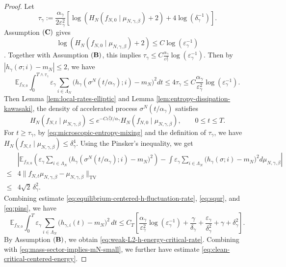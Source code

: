 \documentclass{article}
\begin{document}
\begin{proof}
Let
\[
\tau_\gamma
:=
\frac{\alpha_\gamma}{2\varepsilon_{\gamma}^2}
\left[
\log\!\left(H_N(f_{N,0}\mid\mu_{N,\gamma,\beta})+2\right) + 4\log(\delta_\gamma^{-1})
\right].
\]
Assumption \(({\bf C})\) gives
\[\log(H_N(f_{N,0}\mid\mu_{N,\gamma,\beta})+2)
\le C\log(\varepsilon_\gamma^{-1})\]. Together with Assumption \(({\bf B})\), this implies
\(
\tau_\gamma \le C\frac{\alpha_\gamma}{\varepsilon_\gamma^{2}}\log(\varepsilon_\gamma^{-1}).
\)
Then by \(|h_\gamma(\sigma;i)-m_N|\le2\), we have
\begin{equation}\label{eq:squr}
    \mathbb E_{f_{N,0}}\int_0^{T\wedge\tau_\gamma} \varepsilon_\gamma \sum_{i\in\Lambda_N} \bigl(h_\gamma(\sigma^N(t/\alpha_\gamma);i)-m_N\bigr)^2 dt \le 4\tau_\gamma \le C \frac{\alpha_\gamma}{\varepsilon_\gamma^{2}}\log(\varepsilon_\gamma^{-1}).
\end{equation}
Then Lemma \ref{lem:local-rates-elliptic} and Lemma \ref{lem:entropy-dissipation-kawasaki}, the density of accelerated process $\sigma^N(t/\alpha_\gamma)$ satisfies 
\begin{equation}\label{eq:microscopic-entropy-mixing}
    H_N(f_{N,t}\mid\mu_{N,\gamma,\beta})
\le e^{- C\varepsilon_{\gamma}^2t/\alpha_\gamma} H_N(f_{N,0}\mid\mu_{N,\gamma,\beta}),
\qquad 0\le t\le T.
\end{equation}
For \(t\ge\tau_\gamma\), by \eqref{eq:microscopic-entropy-mixing} and the
definition of \(\tau_\gamma\), we have
\(
H_N(f_{N,t}\mid\mu_{N,\gamma,\beta}) \le \delta_\gamma^4.
\)
Using the Pinsker's inequality, we get
\begin{align}\label{eq:pins}
    & \left| \mathbb E_{f_{N,0}} \left(\varepsilon_\gamma \sum_{i\in\Lambda_N}
\bigl(h_\gamma(\sigma^N(t/\alpha_\gamma);i)-m_N\bigr)^2 \right) - \int \varepsilon_\gamma \sum_{i\in\Lambda_N}
\bigl(h_\gamma(\sigma;i)-m_N\bigr)^2  d\mu_{N,\gamma,\beta}\right| \nonumber \\
\le & 4\|f_{N,t}\mu_{N,\gamma,\beta}-\mu_{N,\gamma,\beta}\|_{\mathrm{TV}} \nonumber \\
\le & 4\sqrt2\, \delta_\gamma^2 .
\end{align}
Combining estimate \eqref{eq:equilibrium-centered-h-fluctuation-rate}, \eqref{eq:squr}, and \eqref{eq:pins}, we have
\[
\mathbb E_{f_{N,0}}\int_0^T\varepsilon_\gamma\sum_{i\in\Lambda_N} \bigl(h_{\gamma,i}(t)-m_N\bigr)^2\,dt
\le
C_T\left[
\frac{\alpha_\gamma}{\varepsilon_\gamma^{2}}\log(\varepsilon_\gamma^{-1}) +
\frac{\gamma}{\delta_\gamma} +
\frac{\varepsilon_\gamma}{\delta_\gamma^2} +
\gamma + \delta_\gamma^2
\right].
\]
By Assumption \(({\bf B})\), we obtain \eqref{eq:weak-L2-h-energy-critical-rate}.
Combining with \eqref{eq:mass-sector-implies-mN-small}, we further have estimate \eqref{eq:clean-critical-centered-energy}.
\end{proof}
\end{document}

